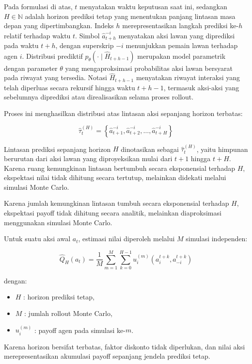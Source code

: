 Pada formulasi di atas, $t$ menyatakan waktu keputusan saat ini, sedangkan $H \in \mathbb{N}$ adalah horizon prediksi tetap yang menentukan panjang lintasan masa depan yang dipertimbangkan. Indeks $h$ merepresentasikan langkah prediksi ke-$h$ relatif terhadap waktu $t$. Simbol $\hat{a}_{t+h}^{-i}$ menyatakan aksi lawan yang diprediksi pada waktu $t+h$, dengan superskrip $-i$ menunjukkan pemain lawan terhadap agen $i$. Distribusi prediktif $p_\theta(\cdot \mid \hat{H}_{t+h-1})$ merupakan model parametrik dengan parameter $\theta$ yang mengaproksimasi probabilitas aksi lawan bersyarat pada riwayat yang tersedia. Notasi $\hat{H}_{t+h-1}$ menyatakan riwayat interaksi yang telah diperluas secara rekursif hingga waktu $t+h-1$, termasuk aksi-aksi yang sebelumnya diprediksi atau direalisasikan selama proses rollout.

Proses ini menghasilkan distribusi atas lintasan aksi sepanjang horizon terbatas:


\[\hat{\tau}_{t}^{(H)} =
\left\{
\hat{a}_{t+1}^{-i},
\hat{a}_{t+2}^{-i},
\dots,
\hat{a}_{t+H}^{-i}
\right\}
\]

Lintasan prediksi sepanjang horizon $H$ dinotasikan sebagai $\hat{\tau}_{t}^{(H)}$, yaitu himpunan berurutan dari aksi lawan yang diproyeksikan mulai dari $t+1$ hingga $t+H$. Karena ruang kemungkinan lintasan bertumbuh secara eksponensial terhadap $H$, ekspektasi nilai tidak dihitung secara tertutup, melainkan didekati melalui simulasi Monte Carlo.


Karena jumlah kemungkinan lintasan tumbuh secara eksponensial terhadap $H$, 
ekspektasi payoff tidak dihitung secara analitik, 
melainkan diaproksimasi menggunakan simulasi Monte Carlo.

Untuk suatu aksi awal $a_t$, estimasi nilai diperoleh melalui $M$ simulasi independen:

\begin{equation}
\hat{Q}_H(a_t)
=
\frac{1}{M}
\sum_{m=1}^{M}
\sum_{k=0}^{H-1}
u_i^{(m)}(a_i^{t+k}, a_{-i}^{t+k})
\end{equation}

dengan:
\begin{itemize}
\item $H$ : horizon prediksi tetap,
\item $M$ : jumlah rollout Monte Carlo,
\item $u_i^{(m)}$ : payoff agen pada simulasi ke-$m$.
\end{itemize}

Karena horizon bersifat terbatas, faktor diskonto tidak diperlukan, 
dan nilai aksi merepresentasikan akumulasi payoff sepanjang jendela prediksi tetap.

